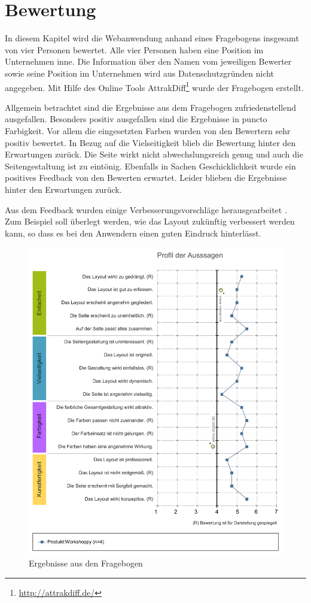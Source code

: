 \chapter{Bewertung}
\label{sec:bewertung}
In diesem Kapitel wird die Webanwendung anhand eines Fragebogens insgesamt von vier Personen bewertet. Alle vier Personen haben eine Position im Unternehmen inne. Die Information über den Namen vom jeweiligen Bewerter sowie seine Position im Unternehmen wird aus Datenschutzgründen nicht angegeben. Mit Hilfe des Online Tools AttrakDiff\footnote{\url{http://attrakdiff.de/}} wurde der Fragebogen erstellt.\bigskip

Allgemein betrachtet sind die Ergebnisse aus dem Fragebogen zufriedenstellend ausgefallen. Besonders positiv ausgefallen sind die Ergebnisse in puncto Farbigkeit. Vor allem die eingesetzten Farben wurden von den Bewertern sehr positiv bewertet. In Bezug auf die Vielseitigkeit blieb die Bewertung hinter den Erwartungen zurück. Die Seite wirkt nicht abwechslungsreich genug und auch die Seitengestaltung ist zu eintönig. Ebenfalls in Sachen Geschicklichkeit wurde ein positives Feedback von den Bewerten erwartet. Leider blieben die Ergebnisse hinter den Erwartungen zurück.\bigskip

Aus dem Feedback wurden einige Verbesserungsvorschläge herausgearbeitet . Zum Beispiel soll überlegt werden, wie das Layout zukünftig verbessert werden kann, so dass es bei den Anwendern einen guten Eindruck hinterlässt.

\begin{figure}[H]
  \begin{center}
    \includegraphics[scale=0.3]{img/das_Profil_der_Aussagen}
	\caption{Ergebnisse aus den Fragebogen} 
	\label{fig:profil der Aussagen}
  \end{center}   
\end{figure}


